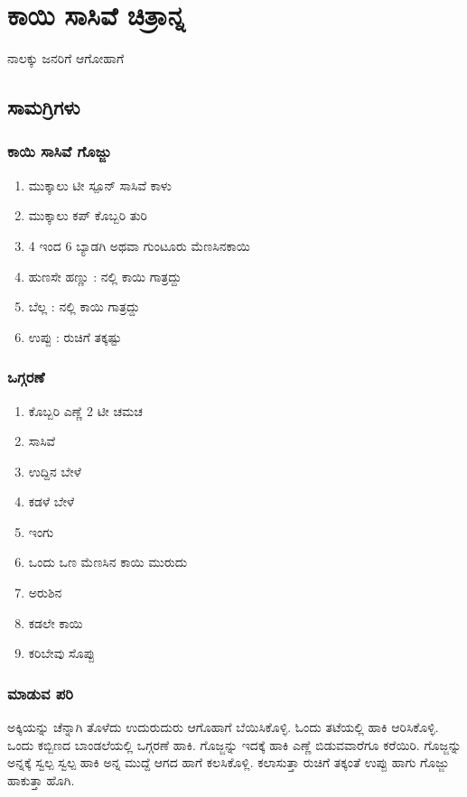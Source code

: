 \documentclass[recipes.tex]{subfiles}
\begin{document}
\section{ಕಾಯಿ ಸಾಸಿವೆ ಚಿತ್ರಾನ್ನ}
{\small ನಾಲಕ್ಕು ಜನರಿಗೆ ಆಗೋಹಾಗೆ }
\subsection{ಸಾಮಗ್ರಿಗಳು}
\subsubsection{ಕಾಯಿ ಸಾಸಿವೆ ಗೊಜ್ಜು}
{
\small 
\begin{enumerate}

    \item ಮುಕ್ಕಾಲು ಟೀ ಸ್ಪೂನ್ ಸಾಸಿವೆ ಕಾಳು 
    \item ಮುಕ್ಕಾಲು ಕಪ್ ಕೊಬ್ಬರಿ ತುರಿ 
    \item 4 ಇಂದ 6 ಬ್ಯಾಡಗಿ ಅಥವಾ ಗುಂಟೂರು ಮೆಣಸಿನಕಾಯಿ  
    \item ಹುಣಸೇ ಹಣ್ಣು : ನಲ್ಲಿ ಕಾಯಿ ಗಾತ್ರದ್ದು  
    \item ಬೆಲ್ಲ : ನಲ್ಲಿ ಕಾಯಿ ಗಾತ್ರದ್ದು  
    \item ಉಪ್ಪು : ರುಚಿಗೆ ತಕ್ಕಷ್ಟು
\end{enumerate}
\subsubsection{ಒಗ್ಗರಣೆ}
\begin{enumerate}
    \item ಕೊಬ್ಬರಿ ಎಣ್ಣೆ 2 ಟೀ ಚಮಚ
    \item ಸಾಸಿವೆ 
    \item ಉದ್ದಿನ ಬೇಳೆ
    \item ಕಡಳೆ  ಬೇಳೆ 
    \item ಇಂಗು
    \item ಒಂದು ಒಣ ಮೆಣಸಿನ ಕಾಯಿ ಮುರುದು
    \item ಅರುಶಿನ
    \item ಕಡಲೇ  ಕಾಯಿ 
    \item ಕರಿಬೇವು ಸೊಪ್ಪು 
\end{enumerate}
\subsubsection{ಮಾಡುವ ಪರಿ}
ಅಕ್ಕಿಯನ್ನು ಚೆನ್ನಾಗಿ ತೊಳೆದು ಉದುರುದುರು ಆಗೊಹಾಗೆ ಬೆಯಿಸಿಕೊಳ್ಳಿ. ಓಂದು ತಟೆಯಲ್ಲಿ ಹಾಕಿ ಆರಿಸಿಕೊಳ್ಳಿ.
ಒಂದು ಕಬ್ಬಿಣದ ಬಾಂಡಲೆಯಲ್ಲಿ ಒಗ್ಗರಣೆ ಹಾಕಿ. ಗೊಜ್ಜನ್ನು ಇದಕ್ಕೆ ಹಾಕಿ ಎಣ್ಣೆ ಬಿಡುವವಾರೆಗೂ ಕರೆಯಿರಿ.
ಗೊಜ್ಜನ್ನು ಅನ್ನಕ್ಕೆ ಸ್ವಲ್ಪ ಸ್ವಲ್ಪ ಹಾಕಿ ಅನ್ನ ಮುದ್ದೆ ಆಗದ ಹಾಗೆ ಕಲಸಿಕೊಳ್ಲಿ. ಕಲಾಸುತ್ತಾ ರುಚಿಗೆ ತಕ್ಕಂತೆ ಉಪ್ಪು ಹಾಗು 
ಗೊಜ್ಜು ಹಾಕುತ್ತಾ ಹೊಗಿ.
}
\end{document}
